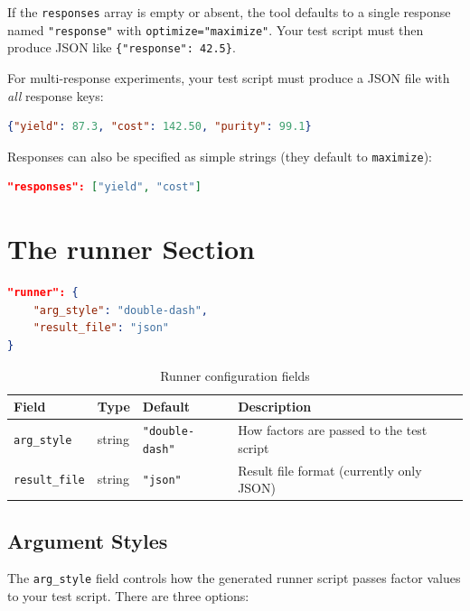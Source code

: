 \documentclass[11pt]{book}
\begin{document}
\begin{keypoint}
If the \texttt{responses} array is empty or absent, the tool defaults to a single response named \texttt{"response"} with \texttt{optimize="maximize"}. Your test script must then produce JSON like \texttt{\{"response": 42.5\}}.
\end{keypoint}

For multi-response experiments, your test script must produce a JSON file with \emph{all} response keys:

\begin{lstlisting}[language=json]
{"yield": 87.3, "cost": 142.50, "purity": 99.1}
\end{lstlisting}

Responses can also be specified as simple strings (they default to \texttt{maximize}):

\begin{lstlisting}[language=json]
"responses": ["yield", "cost"]
\end{lstlisting}

\section{The runner Section}

\begin{lstlisting}[language=json]
"runner": {
    "arg_style": "double-dash",
    "result_file": "json"
}
\end{lstlisting}

\begin{table}[H]
\centering
\caption{Runner configuration fields}
\begin{tabular}{@{}lllp{5cm}@{}}
\toprule
\textbf{Field} & \textbf{Type} & \textbf{Default} & \textbf{Description} \\
\midrule
\texttt{arg\_style} & string & \texttt{"double-dash"} & How factors are passed to the test script \\
\texttt{result\_file} & string & \texttt{"json"} & Result file format (currently only JSON) \\
\bottomrule
\end{tabular}
\end{table}

\subsection{Argument Styles}

The \texttt{arg\_style} field controls how the generated runner script passes factor values to your test script. There are three options:
\end{document}
